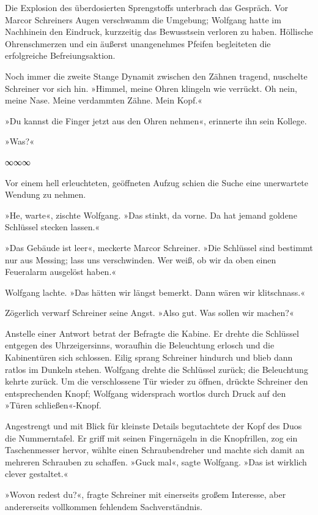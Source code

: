 Die Explosion des überdosierten Sprengstoffs unterbrach das Gespräch. Vor Marcor Schreiners Augen verschwamm die Umgebung; Wolfgang hatte im Nachhinein den Eindruck, kurzzeitig das Bewusstsein verloren zu haben. Höllische Ohrenschmerzen und ein äußerst unangenehmes Pfeifen begleiteten die erfolgreiche Befreiungsaktion.

Noch immer die zweite Stange Dynamit zwischen den Zähnen tragend, nuschelte Schreiner vor sich hin. »Himmel, meine Ohren klingeln wie verrückt. Oh nein, meine Nase. Meine verdammten Zähne. Mein Kopf.«

»Du kannst die Finger jetzt aus den Ohren nehmen«, erinnerte ihn sein Kollege.

»Was?«

\begin{center}
∞∞∞
\end{center}

Vor einem hell erleuchteten, geöffneten Aufzug schien die Suche eine unerwartete Wendung zu nehmen.

»He, warte«, zischte Wolfgang. »Das stinkt, da vorne. Da hat jemand goldene Schlüssel stecken lassen.«

»Das Gebäude ist leer«, meckerte Marcor Schreiner. »Die Schlüssel sind bestimmt nur aus Messing; lass uns verschwinden. Wer weiß, ob wir da oben einen Feueralarm ausgelöst haben.«

Wolfgang lachte. »Das hätten wir längst bemerkt. Dann wären wir klitschnass.«

Zögerlich verwarf Schreiner seine Angst. »Also gut. Was sollen wir machen?«

Anstelle einer Antwort betrat der Befragte die Kabine. Er drehte die Schlüssel entgegen des Uhrzeigersinns, woraufhin die Beleuchtung erlosch und die Kabinentüren sich schlossen. Eilig sprang Schreiner hindurch und blieb dann ratlos im Dunkeln stehen. Wolfgang drehte die Schlüssel zurück; die Beleuchtung kehrte zurück. Um die verschlossene Tür wieder zu öffnen, drückte Schreiner den entsprechenden Knopf; Wolfgang widersprach wortlos durch Druck auf den »Türen schließen«-Knopf.

Angestrengt und mit Blick für kleinste Details begutachtete der Kopf des Duos die Nummerntafel. Er griff mit seinen Fingernägeln in die Knopfrillen, zog ein Taschenmesser hervor, wählte einen Schraubendreher und machte sich damit an mehreren Schrauben zu schaffen. »Guck mal«, sagte Wolfgang. »Das ist wirklich clever gestaltet.«

»Wovon redest du?«, fragte Schreiner mit einerseits großem Interesse, aber andererseits vollkommen fehlendem Sachverständnis.

